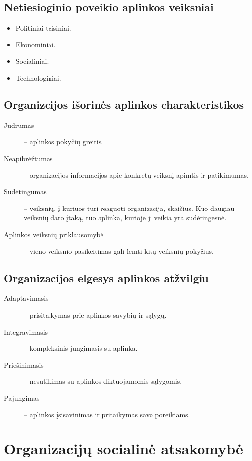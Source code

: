 \section{Netiesioginio poveikio aplinkos veiksniai}

\begin{itemize}
  \item Politiniai-teisiniai.
  \item Ekonominiai.
  \item Socialiniai.
  \item Technologiniai.
\end{itemize}

\section{Organizcijos išorinės aplinkos charakteristikos}

\begin{description}
  \item[Judrumas] – aplinkos pokyčių greitis.
  \item[Neapibrėžtumas] – organizacijos informacijos apie konkretų
    veiksnį apimtis ir patikimumas.
  \item[Sudėtingumas] – veiksnių, į kuriuos turi reaguoti organizacija,
    skaičius. Kuo daugiau veiksnių daro įtaką, tuo aplinka, kurioje
    ji veikia yra sudėtingesnė.
  \item[Aplinkos veiksnių priklausomybė] – vieno veiksnio pasikeitimas
    gali lemti kitų veiksnių pokyčius.
\end{description}

\section{Organizacijos elgesys aplinkos atžvilgiu}

\begin{description}
  \item[Adaptavimasis] – prisitaikymas prie aplinkos savybių ir sąlygų.
  \item[Integravimasis] – kompleksinis jungimasis su aplinka.
  \item[Priešinimasis] – nesutikimas su aplinkos diktuojamomis sąlygomis.
  \item[Pajungimas] – aplinkos įsisavinimas ir pritaikymas savo poreikiams.
\end{description}

\chapter{Organizacijų socialinė atsakomybė}

